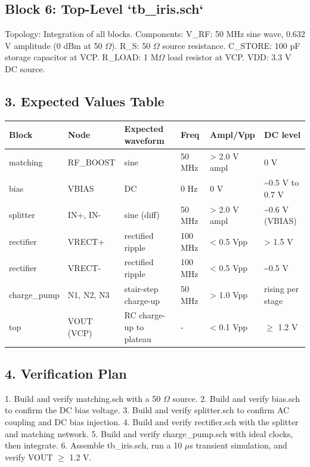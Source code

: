 \documentclass[journal]{IEEEtran}
\begin{document}
\subsection{Block 6: Top-Level `tb\_iris.sch`}
Topology: Integration of all blocks.
Components:
V\_RF: 50 MHz sine wave, 0.632 V amplitude (0 dBm at 50 $\Omega$).
R\_S: 50 $\Omega$ source resistance.
C\_STORE: 100 pF storage capacitor at VCP.
R\_LOAD: 1 M$\Omega$ load resistor at VCP.
VDD: 3.3 V DC source.
\subsection{3. Expected Values Table}
\begin{table}[!t]
\centering
\footnotesize
\begin{tabular}{llllll}
\hline
\textbf{Block} & \textbf{Node} & \textbf{Expected waveform} & \textbf{Freq} & \textbf{Ampl/Vpp} & \textbf{DC level} \\
\hline
matching & RF\_BOOST & sine & 50 MHz & > 2.0 V ampl & 0 V \\
bias & VBIAS & DC & 0 Hz & 0 V & \textasciitilde{}0.5 V to 0.7 V \\
splitter & IN+, IN- & sine (diff) & 50 MHz & > 2.0 V ampl & \textasciitilde{}0.6 V (VBIAS) \\
rectifier & VRECT+ & rectified ripple & 100 MHz & < 0.5 Vpp & > 1.5 V \\
rectifier & VRECT- & rectified ripple & 100 MHz & < 0.5 Vpp & \textasciitilde{}0.5 V \\
charge\_pump & N1, N2, N3 & stair-step charge-up & 50 MHz & > 1.0 Vpp & rising per stage \\
top & VOUT (VCP) & RC charge-up to plateau & - & < 0.1 Vpp & $\ge$ 1.2 V \\
\hline
\end{tabular}
\end{table}
\subsection{4. Verification Plan}
1.  Build and verify matching.sch with a 50 $\Omega$ source.
2.  Build and verify bias.sch to confirm the DC bias voltage.
3.  Build and verify splitter.sch to confirm AC coupling and DC bias injection.
4.  Build and verify rectifier.sch with the splitter and matching network.
5.  Build and verify charge\_pump.sch with ideal clocks, then integrate.
6.  Assemble tb\_iris.sch, run a 10 $\mu$s transient simulation, and verify VOUT $\ge$ 1.2 V.
\end{document}
